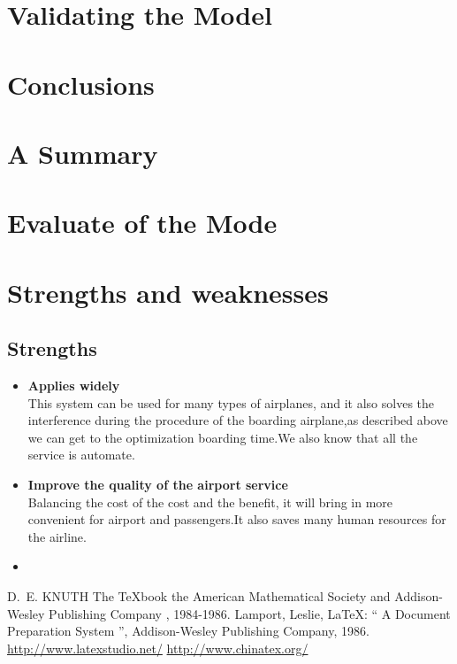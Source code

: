 \documentclass{mcmthesis}
\begin{document}
\section{Validating the Model}
\lipsum[9]

\section{Conclusions}
\lipsum[6]

\section{A Summary}
\lipsum[6]

\section{Evaluate of the Mode}

\section{Strengths and weaknesses}
\lipsum[12]

\subsection{Strengths}
\begin{itemize}
\item \textbf{Applies widely}\\
This  system can be used for many types of airplanes, and it also
solves the interference during  the procedure of the boarding
airplane,as described above we can get to the  optimization
boarding time.We also know that all the service is automate.
\item \textbf{Improve the quality of the airport service}\\
Balancing the cost of the cost and the benefit, it will bring in
more convenient  for airport and passengers.It also saves many
human resources for the airline. \item \textbf{}
\end{itemize}

\begin{thebibliography}{99}
 D.~E. KNUTH   The \TeX{}book  the American
Mathematical Society and Addison-Wesley
Publishing Company , 1984-1986.
Lamport, Leslie,  \LaTeX{}: `` A Document Preparation System '',
Addison-Wesley Publishing Company, 1986.
\url{http://www.latexstudio.net/}
\url{http://www.chinatex.org/}
\end{thebibliography}
\end{document}

